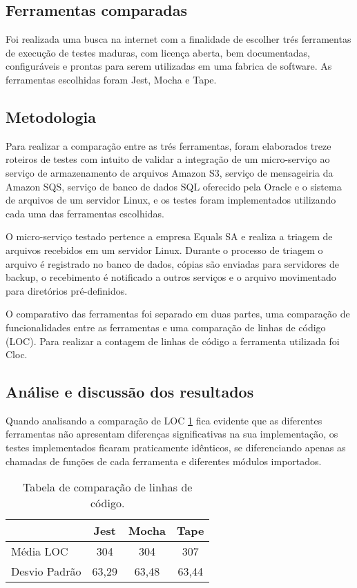 \documentclass[10pt,brazil,english]{article}
\begin{document}
\subsection{Ferramentas comparadas}
Foi realizada uma busca na internet com a finalidade de escolher trés ferramentas de execução de testes maduras, com licença aberta, bem documentadas, configuráveis e prontas para serem utilizadas em uma fabrica de software. As ferramentas escolhidas foram Jest, Mocha e Tape.

\subsection{Metodologia}
Para realizar a comparação entre as trés ferramentas, foram elaborados treze roteiros de testes com intuito de validar a integração de um micro-serviço ao serviço de armazenamento de arquivos Amazon S3, serviço de mensageiria da Amazon SQS, serviço de banco de dados SQL oferecido pela Oracle e o sistema de arquivos de um servidor Linux, e os testes foram implementados utilizando cada uma das ferramentas escolhidas.

O micro-serviço testado pertence a empresa Equals SA e realiza a triagem de arquivos recebidos em um servidor Linux. Durante o processo de triagem o arquivo é registrado no banco de dados, cópias são enviadas para servidores de backup, o recebimento é notificado a outros serviços e o arquivo movimentado para diretórios pré-definidos.

O comparativo das ferramentas foi separado em duas partes, uma comparação de funcionalidades entre as ferramentas e uma comparação de linhas de código (LOC). Para realizar a contagem de linhas de código a ferramenta utilizada foi Cloc\cite{cloc}.

\subsection{Análise e  discussão dos resultados}
Quando analisando a comparação de LOC \ref{tab:comparacao-loc} fica evidente que as diferentes ferramentas não apresentam diferenças significativas na sua implementação, os testes implementados ficaram praticamente idênticos, se diferenciando apenas as chamadas de funções de cada ferramenta e diferentes módulos importados. 

\begin{table}[!hbtp]
\centering
\begin{tabular}{l|c|c|c|}
\cline{2-4}
\textit{}                           & Jest  & Mocha & Tape  \\ \hline
\multicolumn{1}{|l|}{Média LOC}     & 304   & 304   & 307   \\ \hline
\multicolumn{1}{|l|}{Desvio Padrão} & 63,29 & 63,48 & 63,44 \\ \hline
\end{tabular}
\caption{Tabela de comparação de linhas de código.}
\label{tab:comparacao-loc}
\end{table}
\end{document}
